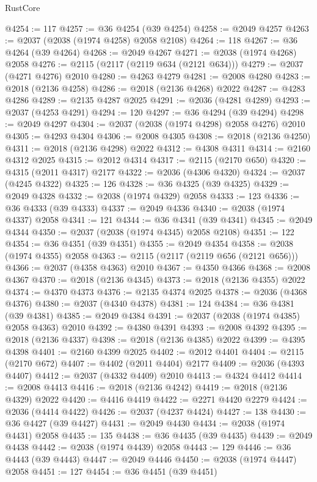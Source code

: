 \begin{lexlean}{RustCore}
\begin{coremodule}
@4254 := 117
@4257 := @36 @4254 (@39 @4254)
@4258 := @2049 @4257
@4263 := @2037 (@2038 (@1974 @4258) @2058 @2108)
@4264 := 118
@4267 := @36 @4264 (@39 @4264)
@4268 := @2049 @4267
@4271 := @2038 (@1974 @4268) @2058
@4276 := @2115 (@2117 (@2119 @634 (@2121 @634)))
@4279 := @2037 (@4271 @4276) @2010
@4280 := @4263 @4279
@4281 := @2008 @4280
@4283 := @2018 (@2136 @4258)
@4286 := @2018 (@2136 @4268) @2022
@4287 := @4283 @4286
@4289 := @2135 @4287 @2025
@4291 := @2036 (@4281 @4289)
@4293 := @2037 (@4253 @4291)
@4294 := 120
@4297 := @36 @4294 (@39 @4294)
@4298 := @2049 @4297
@4304 := @2037 (@2038 (@1974 @4298) @2058 @4276) @2010
@4305 := @4293 @4304
@4306 := @2008 @4305
@4308 := @2018 (@2136 @4250)
@4311 := @2018 (@2136 @4298) @2022
@4312 := @4308 @4311
@4314 := @2160 @4312 @2025
@4315 := @2012 @4314
@4317 := @2115 (@2170 @650)
@4320 := @4315 (@2011 @4317) @2177
@4322 := @2036 (@4306 @4320)
@4324 := @2037 (@4245 @4322)
@4325 := 126
@4328 := @36 @4325 (@39 @4325)
@4329 := @2049 @4328
@4332 := @2038 (@1974 @4329) @2058
@4333 := 123
@4336 := @36 @4333 (@39 @4333)
@4337 := @2049 @4336
@4340 := @2038 (@1974 @4337) @2058
@4341 := 121
@4344 := @36 @4341 (@39 @4341)
@4345 := @2049 @4344
@4350 := @2037 (@2038 (@1974 @4345) @2058 @2108)
@4351 := 122
@4354 := @36 @4351 (@39 @4351)
@4355 := @2049 @4354
@4358 := @2038 (@1974 @4355) @2058
@4363 := @2115 (@2117 (@2119 @656 (@2121 @656)))
@4366 := @2037 (@4358 @4363) @2010
@4367 := @4350 @4366
@4368 := @2008 @4367
@4370 := @2018 (@2136 @4345)
@4373 := @2018 (@2136 @4355) @2022
@4374 := @4370 @4373
@4376 := @2135 @4374 @2025
@4378 := @2036 (@4368 @4376)
@4380 := @2037 (@4340 @4378)
@4381 := 124
@4384 := @36 @4381 (@39 @4381)
@4385 := @2049 @4384
@4391 := @2037 (@2038 (@1974 @4385) @2058 @4363) @2010
@4392 := @4380 @4391
@4393 := @2008 @4392
@4395 := @2018 (@2136 @4337)
@4398 := @2018 (@2136 @4385) @2022
@4399 := @4395 @4398
@4401 := @2160 @4399 @2025
@4402 := @2012 @4401
@4404 := @2115 (@2170 @672)
@4407 := @4402 (@2011 @4404) @2177
@4409 := @2036 (@4393 @4407)
@4412 := @2037 (@4332 @4409) @2010
@4413 := @4324 @4412
@4414 := @2008 @4413
@4416 := @2018 (@2136 @4242)
@4419 := @2018 (@2136 @4329) @2022
@4420 := @4416 @4419
@4422 := @2271 @4420 @2279
@4424 := @2036 (@4414 @4422)
@4426 := @2037 (@4237 @4424)
@4427 := 138
@4430 := @36 @4427 (@39 @4427)
@4431 := @2049 @4430
@4434 := @2038 (@1974 @4431) @2058
@4435 := 135
@4438 := @36 @4435 (@39 @4435)
@4439 := @2049 @4438
@4442 := @2038 (@1974 @4439) @2058
@4443 := 129
@4446 := @36 @4443 (@39 @4443)
@4447 := @2049 @4446
@4450 := @2038 (@1974 @4447) @2058
@4451 := 127
@4454 := @36 @4451 (@39 @4451)

\end{coremodule}
\end{lexlean}
